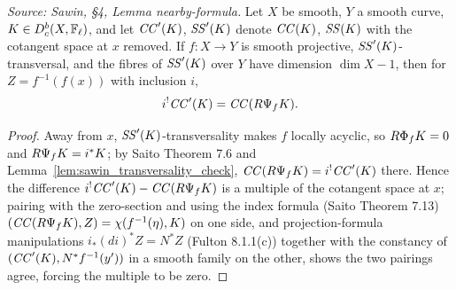 \begin{lemma}
  \label{lem:sawin_nearby_formula}
  \textit{Source: Sawin, §4, Lemma nearby-formula.}
  Let $X$ be smooth, $Y$ a smooth curve, $K\in D^b_c(X,\mathbb{F}_\ell)$, and let
  $\mathit{CC}'(K)$, $\mathit{SS}'(K)$ denote $\mathit{CC}(K)$, $\mathit{SS}(K)$ with the cotangent
  space at $x$ removed.  If $f:X\to Y$ is smooth projective, $\mathit{SS}'(K)$-transversal,
  and the fibres of $\mathit{SS}'(K)$ over $Y$ have dimension $\dim X-1$, then for
  $Z=f^{-1}(f(x))$ with inclusion $i$,
  \[ i^!\mathit{CC}'(K) = \mathit{CC}(R\Psi_f K). \]
\end{lemma}
\begin{proof}
  Away from $x$, $\mathit{SS}'(K)$-transversality makes $f$ locally acyclic, so
  $R\Phi_f K=0$ and $R\Psi_f K=i^*K$; by Saito Theorem 7.6 and
  Lemma~\ref{lem:sawin_transversality_check}, $\mathit{CC}(R\Psi_f K)=i^!\mathit{CC}'(K)$
  there.  Hence the difference $i^!\mathit{CC}'(K)-\mathit{CC}(R\Psi_f K)$ is a multiple of
  the cotangent space at $x$; pairing with the zero-section and using the index
  formula (Saito Theorem 7.13) $(\mathit{CC}(R\Psi_f K),Z)=\chi(f^{-1}(\eta),K)$ on one
  side, and projection-formula manipulations $i_*(di)^*Z = N^*Z$ (Fulton
  8.1.1(c)) together with the constancy of $(\mathit{CC}'(K),N^*f^{-1}(y'))$ in a smooth
  family on the other, shows the two pairings agree, forcing the multiple to be
  zero.
\end{proof}

